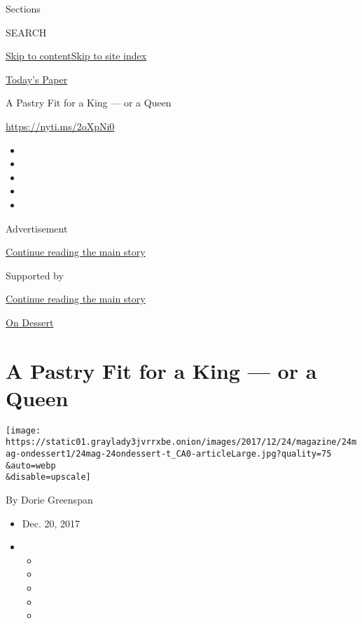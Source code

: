 Sections

SEARCH

\protect\hyperlink{site-content}{Skip to
content}\protect\hyperlink{site-index}{Skip to site index}

\href{https://myaccount.nytimes3xbfgragh.onion/auth/login?response_type=cookie\&client_id=vi}{}

\href{https://www.nytimes3xbfgragh.onion/section/todayspaper}{Today's
Paper}

A Pastry Fit for a King --- or a Queen

\url{https://nyti.ms/2oXpNi0}

\begin{itemize}
\item
\item
\item
\item
\item
\end{itemize}

Advertisement

\protect\hyperlink{after-top}{Continue reading the main story}

Supported by

\protect\hyperlink{after-sponsor}{Continue reading the main story}

\href{/column/on-dessert}{On Dessert}

\hypertarget{a-pastry-fit-for-a-king--or-a-queen}{%
\section{A Pastry Fit for a King --- or a
Queen}\label{a-pastry-fit-for-a-king--or-a-queen}}

\texttt{[image: https://static01.graylady3jvrrxbe.onion/images/2017/12/24/magazine/24mag-ondessert1/24mag-24ondessert-t\_CA0-articleLarge.jpg?quality=75\\\&auto=webp\\\&disable=upscale]}

By Dorie Greenspan

\begin{itemize}
\item
  Dec. 20, 2017
\item
  \begin{itemize}
  \item
  \item
  \item
  \item
  \item
  \end{itemize}
\end{itemize}

